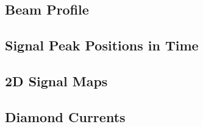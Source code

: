 \documentclass[9pt]{beamer}
\begin{document}
\subsection{Beam Profile}
\begin{frame}
\end{frame}
\subsection{Signal Peak Positions in Time}
\begin{frame}
\end{frame}
\subsection{2D Signal Maps}
\begin{frame}
\end{frame}
\subsection{Diamond Currents}
\begin{frame}
\end{frame}

\end{document}
